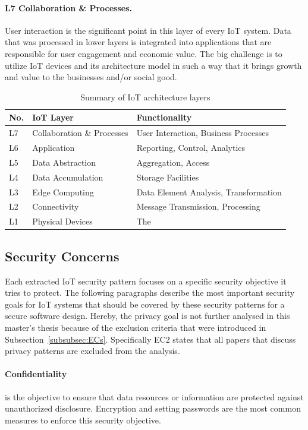 \paragraph{L7 Collaboration \& Processes.}
User interaction is the significant point in this layer of every IoT system. Data that was processed in lower layers is integrated into applications that are responsible for user engagement and economic value. The big challenge is to utilize IoT devices and its architecture model in such a way that it brings growth and value to the businesses and/or social good.

\begin{table}[ht]
	\centering
	\caption{Summary of IoT architecture layers\protect\footnotemark[\value{footnote}]}
	\label{tab:IoT-world-ref}
	\begin{tabular}{lll}
		\hline
		\textbf{No.} & \textbf{IoT Layer} & \textbf{Functionality} \\
		\hline
		L7 & Collaboration \& Processes & User Interaction, Business Processes \\
		L6 & Application & Reporting, Control, Analytics  \\
		L5 & Data Abstraction & Aggregation, Access \\
		L4 & Data Accumulation & Storage Facilities \\
		L3 & Edge Computing & Data Element Analysis, Transformation \\
		L2 & Connectivity & Message Transmission, Processing \\
		L1 & Physical Devices & The \q{Things} \\
		\hline 
	\end{tabular}
\end{table}

\subsection{Security Concerns}\label{subsec:security}
Each extracted IoT security pattern focuses on a specific security objective it tries to protect. The following paragraphs describe the most important security goals for IoT systems that should be covered by these security patterns for a secure software design. Hereby, the privacy goal is not further analysed in this master's thesis because of the exclusion criteria that were introduced in Subsection~\ref{subsubsec:ECs}. Specifically EC2 states that all papers that discuss privacy patterns are excluded from the analysis.

\paragraph{Confidentiality} is the objective to ensure that data resources or information are protected against unauthorized disclosure. Encryption and setting passwords are the most common measures to enforce this security objective.

